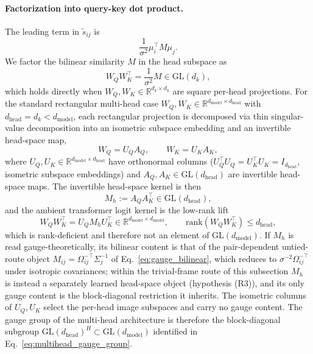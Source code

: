 \paragraph{Factorization into query-key dot product.}
The leading term in $\tilde{s}_{ij}$ is
\begin{equation}
\frac{1}{\sigma^2}\mu_i^\top M \mu_j.
\end{equation}
We factor the bilinear similarity $M$ in the head subspace as
\begin{equation}
W_Q W_K^\top = \frac{1}{\sigma^2} M \in \mathrm{GL}(d_k),
\label{eq:wqwk_square}
\end{equation}
which holds directly when $W_Q, W_K \in \mathbb{R}^{d_k \times d_k}$ are square per-head projections. For the standard rectangular multi-head case $W_Q, W_K \in \mathbb{R}^{d_{\text{model}}\times d_{\text{head}}}$ with $d_{\text{head}} = d_k < d_{\text{model}}$, each rectangular projection is decomposed via thin singular-value decomposition into an isometric subspace embedding and an invertible head-space map,
\begin{equation}
W_Q = U_Q A_Q, \qquad W_K = U_K A_K,
\label{eq:thin_svd_decomposition}
\end{equation}
where $U_Q, U_K \in \mathbb{R}^{d_{\text{model}}\times d_{\text{head}}}$ have orthonormal columns ($U_Q^\top U_Q = U_K^\top U_K = I_{d_{\text{head}}}$, isometric subspace embeddings) and $A_Q, A_K \in \mathrm{GL}(d_{\text{head}})$ are invertible head-space maps. The invertible head-space kernel is then
\begin{equation}
M_h := A_Q A_K^\top \in \mathrm{GL}(d_{\text{head}}),
\label{eq:head_space_kernel_participatory}
\end{equation}
and the ambient transformer logit kernel is the low-rank lift
\begin{equation}
W_Q W_K^\top = U_Q M_h U_K^\top \in \mathbb{R}^{d_{\text{model}}\times d_{\text{model}}}, \qquad \mathrm{rank}(W_Q W_K^\top) \le d_{\text{head}},
\label{eq:low_rank_lift}
\end{equation}
which is rank-deficient and therefore not an element of $\mathrm{GL}(d_{\text{model}})$. If $M_h$ is read gauge-theoretically, its bilinear content is that of the pair-dependent untied-route object $M_{ij} = \Omega_{ij}^{-\top}\Sigma_j^{-1}$ of Eq.~\eqref{eq:gauge_bilinear}, which reduces to $\sigma^{-2}\Omega_{ij}^{-\top}$ under isotropic covariances; within the trivial-frame route of this subsection $M_h$ is instead a separately learned head-space object (hypothesis (R3)), and its only gauge content is the block-diagonal restriction it inherits. The isometric columns of $U_Q, U_K$ select the per-head image subspaces and carry no gauge content. The gauge group of the multi-head architecture is therefore the block-diagonal subgroup $\mathrm{GL}(d_{\text{head}})^H \subset \mathrm{GL}(d_{\text{model}})$ identified in Eq.~\eqref{eq:multihead_gauge_group}.

